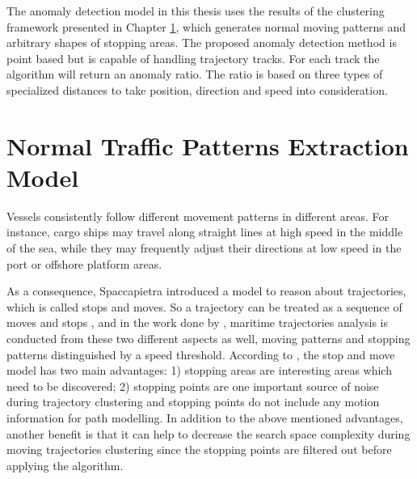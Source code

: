 \documentclass[12pt,glossary]{dalcsthesis}
\begin{document}
The anomaly detection model in this thesis uses the results of the clustering framework presented in Chapter \ref{ch:normal_traffic_extraction_model}, which generates normal moving patterns and arbitrary shapes of stopping areas.
The proposed anomaly detection method is point based but is capable of handling trajectory tracks. For each track the algorithm will return an anomaly ratio. The ratio is based on three types of specialized distances to take position, direction and speed into consideration.




\chapter{Normal Traffic Patterns Extraction Model}
\label{ch:normal_traffic_extraction_model}

Vessels consistently follow different movement patterns in different areas. For instance, cargo ships may travel along straight lines at high speed in the middle of the sea, while they may frequently adjust their directions at low speed in the port or offshore platform areas. 

As a consequence, Spaccapietra \cite{stopmove} introduced a model to reason about trajectories, which is called stops and moves. So a trajectory can be treated as a sequence of moves and stops \cite{stopmove}, and in the work done by \cite{vespe12}\cite{PallottaFramework}\cite{Nicolas}, maritime trajectories analysis is conducted from these two different aspects as well, moving patterns and stopping patterns distinguished by a speed threshold. According to \cite{Nicolas}, the stop and move model has two main advantages: 1) stopping areas are interesting areas which need to be discovered; 2) stopping points are one important source of noise during trajectory clustering and stopping points do not include any motion information for path modelling. In addition to the above mentioned advantages, another benefit is that it can help to decrease the search space complexity during moving trajectories clustering since the stopping points are filtered out before applying the algorithm. %
\end{document}
